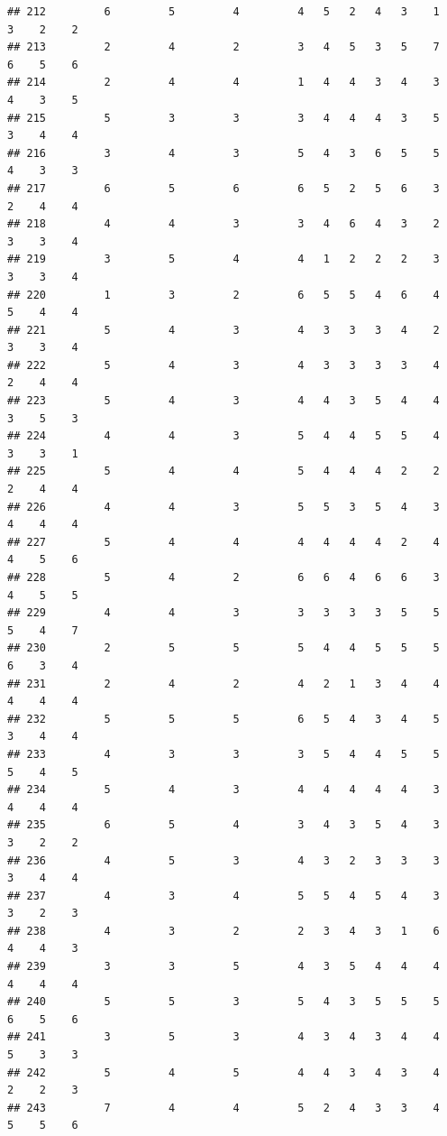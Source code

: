 \documentclass[
]{article}
\begin{document}
\begin{verbatim}
## 212         6         5         4         4   5   2   4   3    1    3    2    2
## 213         2         4         2         3   4   5   3   5    7    6    5    6
## 214         2         4         4         1   4   4   3   4    3    4    3    5
## 215         5         3         3         3   4   4   4   3    5    3    4    4
## 216         3         4         3         5   4   3   6   5    5    4    3    3
## 217         6         5         6         6   5   2   5   6    3    2    4    4
## 218         4         4         3         3   4   6   4   3    2    3    3    4
## 219         3         5         4         4   1   2   2   2    3    3    3    4
## 220         1         3         2         6   5   5   4   6    4    5    4    4
## 221         5         4         3         4   3   3   3   4    2    3    3    4
## 222         5         4         3         4   3   3   3   3    4    2    4    4
## 223         5         4         3         4   4   3   5   4    4    3    5    3
## 224         4         4         3         5   4   4   5   5    4    3    3    1
## 225         5         4         4         5   4   4   4   2    2    2    4    4
## 226         4         4         3         5   5   3   5   4    3    4    4    4
## 227         5         4         4         4   4   4   4   2    4    4    5    6
## 228         5         4         2         6   6   4   6   6    3    4    5    5
## 229         4         4         3         3   3   3   3   5    5    5    4    7
## 230         2         5         5         5   4   4   5   5    5    6    3    4
## 231         2         4         2         4   2   1   3   4    4    4    4    4
## 232         5         5         5         6   5   4   3   4    5    3    4    4
## 233         4         3         3         3   5   4   4   5    5    5    4    5
## 234         5         4         3         4   4   4   4   4    3    4    4    4
## 235         6         5         4         3   4   3   5   4    3    3    2    2
## 236         4         5         3         4   3   2   3   3    3    3    4    4
## 237         4         3         4         5   5   4   5   4    3    3    2    3
## 238         4         3         2         2   3   4   3   1    6    4    4    3
## 239         3         3         5         4   3   5   4   4    4    4    4    4
## 240         5         5         3         5   4   3   5   5    5    6    5    6
## 241         3         5         3         4   3   4   3   4    4    5    3    3
## 242         5         4         5         4   4   3   4   3    4    2    2    3
## 243         7         4         4         5   2   4   3   3    4    5    5    6

\end{verbatim}
\end{document}

